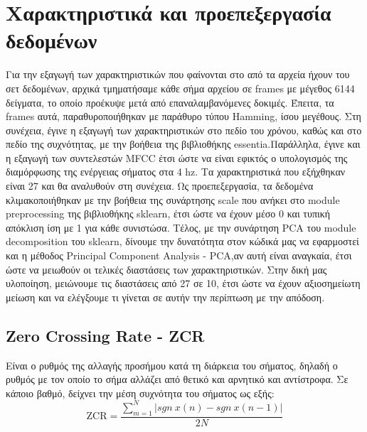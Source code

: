 \section{Χαρακτηριστικά και προεπεξεργασία δεδομένων}

Για την εξαγωγή των χαρακτηριστικών που φαίνονται στο από τα αρχεία ήχουν του σετ δεδομένων, αρχικά τμηματήσαμε κάθε σήμα αρχείου σε frames με μέγεθος 6144 δείγματα, το οποίο προέκυψε μετά από επαναλαμβανόμενες δοκιμές.
 Έπειτα, τα frames αυτά, παραθυροποιήθηκαν με παράθυρο τύπου Hamming, ίσου μεγέθους. 
 Στη συνέχεια, έγινε η εξαγωγή των χαρακτηριστικών στο πεδίο του χρόνου, καθώς και στο πεδίο της συχνότητας, με την βοήθεια της βιβλιοθήκης essentia.Παράλληλα, έγινε και η εξαγωγή των συντελεστών MFCC έτσι ώστε να είναι εφικτός ο υπολογισμός της διαμόρφωσης της ενέργειας σήματος στα 4 hz. Τα χαρακτηριστικά που εξήχθηκαν είναι 27 και θα αναλυθούν στη συνέχεια. Ως προεπεξεργασία, τα δεδομένα κλιμακοποιήθηκαν με την βοήθεια  της συνάρτησης scale που ανήκει στο module preprocessing της βιβλιοθήκης sklearn, έτσι ώστε να έχουν μέσο 0 και τυπική απόκλιση ίση με 1 για κάθε συνιστώσα. Τέλος, με την συνάρτηση PCA του module decomposition του sklearn, δίνουμε την δυνατότητα στον κώδικά μας να εφαρμοστεί και η μέθοδος Principal Component Analysis - PCA,αν αυτή είναι αναγκαία, έτσι ώστε να μειωθούν οι τελικές διαστάσεις των χαρακτηριστικών. Στην δική μας υλοποίηση, μειώνουμε τις διαστάσεις από 27 σε 10, έτσι ώστε να έχουν αξιοσημείωτη μείωση και να ελέγξουμε τι γίνεται σε αυτήν την περίπτωση με την απόδοση.  


\subsection{Zero Crossing Rate - ZCR}

Είναι ο ρυθμός της αλλαγής προσήμου κατά τη διάρκεια του σήματος, δηλαδή ο ρυθμός με τον οποίο το σήμα αλλάζει από θετικό και αρνητικό και αντίστροφα. Σε κάποιο βαθμό, δείχνει την μέση συχνότητα του σήματος ως εξής:
\begin{equation}
\text{ZCR} = \frac{\sum_{m=1}^{N} |sgn ~x(n) - sgn~x(n-1)| }{2N}
\end{equation}

